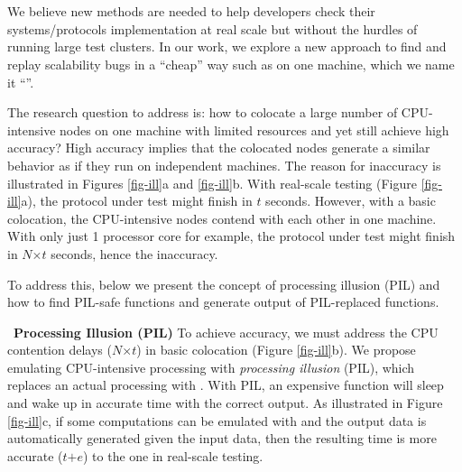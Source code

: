 


\section{\sck}
\label{sec-sck}


We believe new methods are needed to help developers check their
systems/protocols implementation at real scale but without the hurdles of
running large test clusters.  
%
In our work, we explore a new approach to find and replay scalability bugs in a
``cheap'' way such as on one machine, which we name it ``\sck''.

The research question to address is: how to colocate a large number of
CPU-intensive nodes on one machine with limited resources and yet still
achieve high accuracy?
%
High accuracy implies that the colocated nodes generate a similar behavior
as if they run on independent machines.
%
The reason for inaccuracy is illustrated in Figures \ref{fig-ill}a
and \ref{fig-ill}b.
%
With real-scale testing (Figure \ref{fig-ill}a), the protocol under test
might finish in $t$ seconds.  However, with a basic colocation, the
CPU-intensive nodes contend with each other in one machine.  With only
just 1 processor core for example, the protocol under test might finish in
$N$$\times$$t$ seconds, hence the inaccuracy.
%

To address this, below we present the concept of processing illusion (PIL) and
how to find PIL-safe functions and generate output of PIL-replaced functions.





%

%


\vnb\ {\bf Processing Illusion (PIL)}
%
To achieve accuracy, we must address the CPU contention delays ($N$$\times$$t$)
in basic colocation (Figure \ref{fig-ill}b).
%
We propose  emulating CPU-intensive processing with {\em processing illusion}
(PIL), which replaces an actual processing with \sleep.
%
With PIL, an expensive function will sleep and wake up in accurate time with the
correct output.
%
As illustrated in Figure \ref{fig-ill}c, if some computations can be emulated
with  and the output data is automatically generated given the input
data, then the resulting time is more accurate ($t$$+$$e$) to the one in
real-scale testing.



